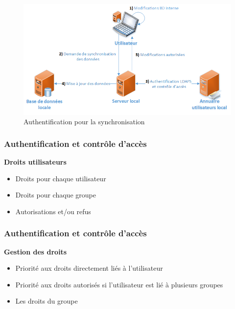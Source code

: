 \begin{figure}[htbp]
	\centering
	\includegraphics[scale=0.55]{Images/SchemaAuthentification.png}
	\caption{Authentification pour la synchronisation}
	\label{SchemaAuthentification}
\end{figure}

\begin{frame}
  \frametitle{Authentification et contrôle d'accès}
  \begin{block}{\textbf{Droits utilisateurs}}
  \begin{itemize}
  \item Droits pour chaque utilisateur
  \item Droits pour chaque groupe
  \item Autorisations et/ou refus
  \end{itemize}
  \end{block}
\end{frame}

\begin{frame}
  \frametitle{Authentification et contrôle d'accès}
  \begin{block}{\textbf{Gestion des droits}}
  \begin{itemize}
  \item Priorité aux droits directement liés à l'utilisateur 
  \item Priorité aux droits autorisés si l'utilisateur est lié à plusieurs groupes
  \item Les droits du groupe
  \end{itemize}
  \end{block}
\end{frame}

